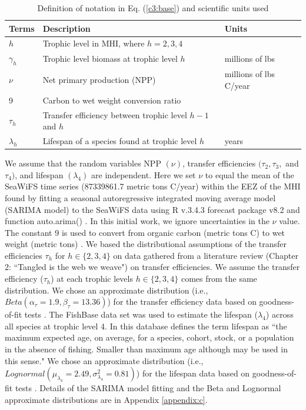 \documentclass[oneside,12pt,final]{sty/ucthesis-CA2012}
\let\cite\citep                             %
\begin{document}
\begin{mainmatter}
\begin{table}[H]
\centering
\caption{Definition of notation in Eq. (\ref{c3:base}) and scientific units used}
\begin{tabular}{l|l|l}
  \hline \small
 Terms & Description & Units  \\ 
   \hline
   $h$ & Trophic level in MHI, where $h = 2,3,4$  & \\
   $\gamma_h$ &  Trophic level biomass at trophic level $h$ & millions of lbs  \\
   $\nu$ & Net primary production (NPP)  & millions of lbs C/year \\
   9 & Carbon to wet weight conversion ratio & \\
   $\tau_{h}$ & Transfer efficiency between trophic level $h-1$ and $h$ &   \\  
   $\lambda_h$ & Lifespan of a species found at trophic level $h$ & years \\
   \hline
\end{tabular} 
\label{c3:description}
\end{table}

We assume that the random variables NPP $(\nu)$, transfer efficiencies $(\tau_2, \tau_3,$ and $\tau_4)$, and lifespan $(\lambda_4)$ are independent. Here we set $\nu$ to equal the mean of the SeaWiFS time series (87339861.7 metric tons C/year) within the EEZ of the MHI found by fitting a seasonal autoregressive integrated moving average model (SARIMA model) to the SeaWiFS data using R v.3.4.3 \cite{Rcite} forecast package v8.2 and function auto.arima() \cite{forecast1, forecast2}. In this initial work, we ignore uncertainties in the $\nu$ value. The constant 9 is used to convert from organic carbon (metric tons C) to wet weight (metric tons) \cite{strathmann1967estimating, pauly1995primary, chassot2010global}. We based the distributional assumptions of the transfer efficiencies $\tau_h$ for $h \in \{2, 3, 4\}$ on data gathered from a literature review (Chapter 2: 		``Tangled is the web we weave") on transfer efficiencies. We assume the transfer efficiency ($\tau_h$) at each trophic levels $h \in \{2, 3, 4\}$ comes from the same distribution. We chose an approximate distribution (i.e., $Beta(\alpha_\tau=1.9, \beta_{\tau}=13.36)$) for the transfer efficiency data based on goodness-of-fit tests \cite{fitdistrplus}. The \citet{fishbase} FishBase data set was used to estimate the lifespan ($\lambda_4$) across all species at trophic level 4. In this database \citet{fishbase} defines the term lifespan as ``the maximum expected age, on average, for a species, cohort, stock, or a population in the absence of fishing. Smaller than maximum age although may be used in this sense." We chose an approximate distribution (i.e., $Lognormal(\mu_{\lambda_4}=2.49, \sigma^2_{\lambda_4}=0.81)$) for the lifespan data based on goodness-of-fit tests \cite{fitdistrplus}. Details of the SARIMA model fitting and the Beta and Lognormal approximate distributions are in Appendix \ref{appendix:c}. 


\end{mainmatter}
\end{document}
